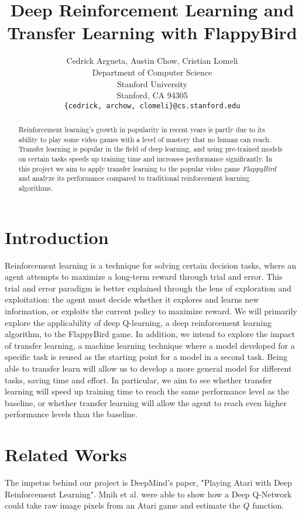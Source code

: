 \documentclass{article}
\title{Deep Reinforcement Learning and Transfer Learning with FlappyBird}
\author{
  Cedrick Argueta, Austin Chow, Cristian Lomeli \\
  Department of Computer Science\\
  Stanford University\\
  Stanford, CA 94305 \\
  \texttt{\{cedrick, archow, clomeli\}@cs.stanford.edu} \\
}
\begin{document}

\maketitle

\begin{abstract}

Reinforcement learning's growth in popularity in recent years is partly due to its ability to play some video games with a level of mastery that no human can reach. 
Transfer learning is popular in the field of deep learning, and using pre-trained models on certain tasks speeds up training time and increases performance significantly. 
In this project we aim to apply transfer learning to the popular video game \textit{FlappyBird} and analyze its performance compared to traditional reinforcement learning algorithms.
 
\end{abstract}


\section{Introduction}
Reinforcement learning is a technique for solving certain decision tasks, where an agent attempts to maximize a long-term reward through trial and error. 
This trial and error paradigm is better explained through the lens of exploration and exploitation: the agent must decide whether it explores and learns new information, or exploits the current policy to maximize reward.
We will primarily explore the applicability of deep Q-learning, a deep reinforcement learning algorithm, to the FlappyBird game.
In addition, we intend to explore the impact of transfer learning, a machine learning technique where a model developed for a specific task is reused as the starting point for a model in a second task. 
Being able to transfer learn will allow us to develop a more general model for different tasks, saving time and effort.
In particular, we aim to see whether transfer learning will speed up training time to reach the same performance level as the baseline, or whether transfer learning will allow the agent to reach even higher performance levels than the baseline.

\section{Related Works}
The impetus behind our project is DeepMind's paper, "Playing Atari with Deep Reinforcement Learning". Mnih et al. were able to show how a Deep Q-Network could take raw image pixels from an Atari game and estimate the $Q$ function. \cite{deepmind}
\end{document}
